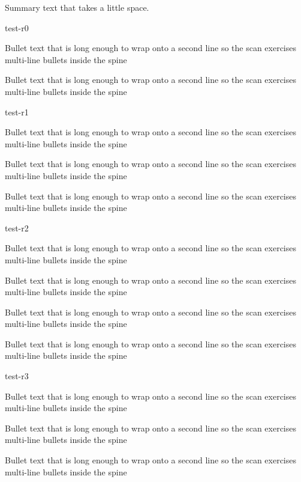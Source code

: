 \documentclass{resume}
\begin{document}
\begin{summary}
  Summary text that takes a little space.
\end{summary}
\begin{experience}
  \begin{role}{test-r0}
    \item Bullet text that is long enough to wrap onto a second line so the scan exercises multi-line bullets inside the spine
    \item Bullet text that is long enough to wrap onto a second line so the scan exercises multi-line bullets inside the spine
  \end{role}
  \begin{role}{test-r1}
    \item Bullet text that is long enough to wrap onto a second line so the scan exercises multi-line bullets inside the spine
    \item Bullet text that is long enough to wrap onto a second line so the scan exercises multi-line bullets inside the spine
    \item Bullet text that is long enough to wrap onto a second line so the scan exercises multi-line bullets inside the spine
  \end{role}
  \begin{role}{test-r2}
    \item Bullet text that is long enough to wrap onto a second line so the scan exercises multi-line bullets inside the spine
    \item Bullet text that is long enough to wrap onto a second line so the scan exercises multi-line bullets inside the spine
    \item Bullet text that is long enough to wrap onto a second line so the scan exercises multi-line bullets inside the spine
    \item Bullet text that is long enough to wrap onto a second line so the scan exercises multi-line bullets inside the spine
  \end{role}
  \begin{role}{test-r3}
    \item Bullet text that is long enough to wrap onto a second line so the scan exercises multi-line bullets inside the spine
    \item Bullet text that is long enough to wrap onto a second line so the scan exercises multi-line bullets inside the spine
    \item Bullet text that is long enough to wrap onto a second line so the scan exercises multi-line bullets inside the spine

\end{role}
\end{experience}
\end{document}
